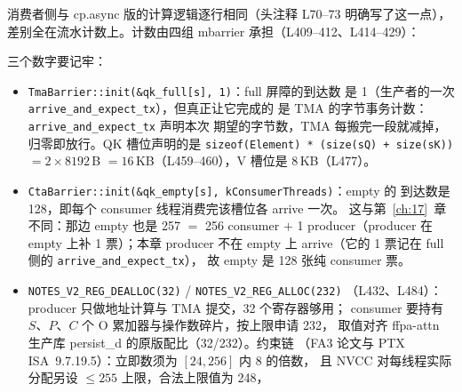 

消费者侧与 cp.async 版的计算逻辑逐行相同（头注释 L70--73 明确写了这一点），
差别全在流水计数上。计数由四组 mbarrier 承担（L409--412、L414--429）：



三个数字要记牢：

\begin{itemize}[itemsep=2pt,topsep=2pt]
  \item \texttt{Tma\allowbreak{}Barrier::\allowbreak{}init\allowbreak{}(\&qk\_\allowbreak{}full[s],\allowbreak{} 1)}：full 屏障的到达数
        是 1（生产者的一次 \texttt{arrive\_\allowbreak{}and\_\allowbreak{}expect\_\allowbreak{}tx}），但真正让它完成的
        是 TMA 的字节事务计数：\texttt{arrive\_\allowbreak{}and\_\allowbreak{}expect\_\allowbreak{}tx} 声明本次
        期望的字节数，TMA 每搬完一段就减掉，归零即放行。QK 槽位声明的是
        \texttt{sizeof\allowbreak{}(Element) * \allowbreak{}(size\allowbreak{}(s\allowbreak{}Q) + size\allowbreak{}(s\allowbreak{}K))} $= 2 \times 8192$\,B
        $= 16$\,KB（L459--460），V 槽位是 8\,KB（L477）。
  \item \texttt{Cta\allowbreak{}Barrier::\allowbreak{}init\allowbreak{}(\&qk\_\allowbreak{}empty[s],\allowbreak{} k\allowbreak{}Consumer\allowbreak{}Threads)}：empty 的
        到达数是 128，即每个 consumer 线程消费完该槽位各 arrive 一次。
        这与第~\ref{ch:17}~章不同：那边 empty 也是 257 $=$ 256 consumer $+$
        1 producer（producer 在 empty 上补 1 票）；本章 producer 不在 empty
        上 arrive（它的 1 票记在 full 侧的 \texttt{arrive\_and\_expect\_tx}），
        故 empty 是 128 张纯 consumer 票。
  \item \texttt{NOTES\_\allowbreak{}V2\_\allowbreak{}REG\_\allowbreak{}DEALLOC\allowbreak{}(32)} / \texttt{NOTES\_\allowbreak{}V2\_\allowbreak{}REG\_\allowbreak{}ALLOC\allowbreak{}(232)}
        （L432、L484）：producer 只做地址计算与 TMA 提交，32 个寄存器够用；
        consumer 要持有 $S$、$P$、$C$ 个 O 累加器与操作数碎片，按上限申请 232，
        取值对齐 ffpa-attn 生产库 persist\_d 的原版配比（32/232）。约束链
        （FA3 论文与 PTX ISA~9.7.19.5）：立即数须为 $[24,256]$ 内 8 的倍数，
        且 NVCC 对每线程实际分配另设 $\le 255$ 上限，合法上限值为 248，

\end{itemize}
